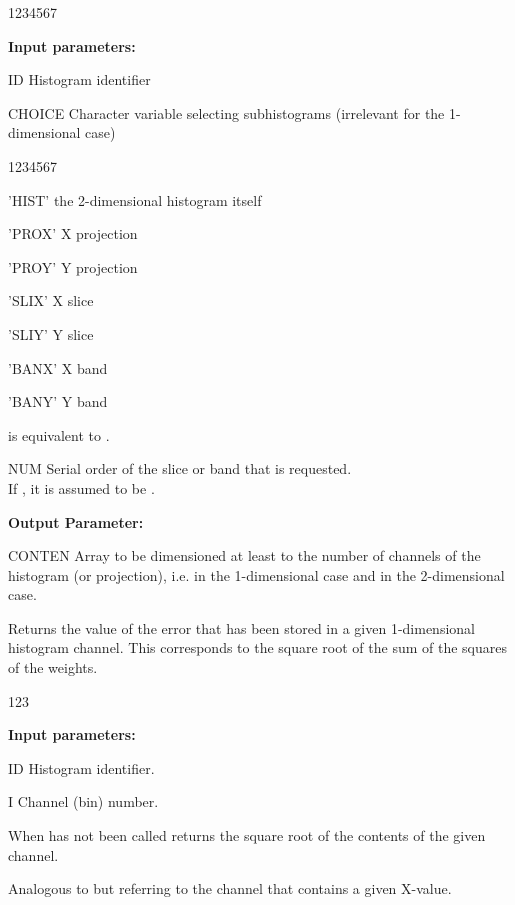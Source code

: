 \begin{DLtt}{1234567}
\item[{\rm\bf Input parameters:}]
\item[ID] Histogram identifier
\item[CHOICE] Character variable selecting subhistograms
(irrelevant for the 1-dimensional case)
\begin{DLtt}{1234567}
\item['HIST'] the 2-dimensional histogram itself
\item['PROX'] X projection
\item['PROY'] Y projection
\item['SLIX'] X slice
\item['SLIY'] Y slice
\item['BANX'] X band
\item['BANY'] Y band
\end{DLtt}
 is equivalent to .
\item[NUM] Serial order of the slice or band that is requested.\\
If , it is assumed to be .
\item[{\rm\bf Output Parameter:}]
\item[CONTEN] Array to be dimensioned at least to the number
of channels of the histogram (or projection), i.e.
 in the 1-dimensional case and
 in the 2-dimensional case.
\end{DLtt}
 
 
\Action
Returns the value of the error that has been stored in a given
1-dimensional histogram channel.
This corresponds to the square root of the sum of
the squares of the weights.
 
\begin{DLtt}{123}
\item[{\rm\bf Input parameters:}]
\item[ID] Histogram identifier.
\item[I] Channel (bin) number.
\end{DLtt}
 
When  has not been called  returns
the square root of the contents of the given channel.
 
 
\Action
Analogous to  but referring to the channel that contains a given
X-value.
 
